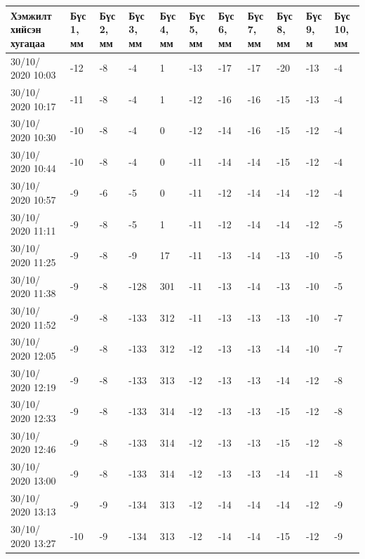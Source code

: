 \begin{table}[h]
    \centering
    \begin{tabular}{|p{1.5cm}|p{0.8cm}|p{0.8cm}|p{0.8cm}|p{0.8cm}|p{0.8cm}|p{0.8cm}|p{0.8cm}|p{0.8cm}|p{0.8cm}|p{0.8cm}|}
         \hline
     Хэмжилт хийсэн хугацаа & Бүс 1, мм&	Бүс 2, мм&	Бүс 3, мм&	Бүс 4, мм&	Бүс 5, мм&	Бүс 6, мм&	Бүс 7, мм&	Бүс 8, мм&	Бүс 9, м&	Бүс 10, мм\\ \hline
30/10/ 2020 10:03&	-12&	-8&	-4&	    1&	-13&-17&-17&-20&	-13&	-4\\ \hline
30/10/ 2020 10:17&	-11&	-8&	-4&	    1&	-12&-16&-16&-15&	-13&	-4\\ \hline
30/10/ 2020 10:30&	-10&	-8&	-4&	    0&	-12&-14&-16&-15&	-12&	-4\\ \hline
30/10/ 2020 10:44&	-10&	-8&	-4&	    0&	-11&-14&-14&-15&	-12&	-4\\ \hline
30/10/ 2020 10:57&	-9&	    -6&	-5&	    0&	-11&-12&-14&-14&	-12&	-4\\ \hline
30/10/ 2020 11:11&	-9&	    -8&	-5&	    1&	-11&-12&-14&-14&	-12&	-5\\ \hline
30/10/ 2020 11:25&	-9&	    -8&	-9&	    17&	-11&-13&-14&-13&	-10&	-5\\ \hline
30/10/ 2020 11:38&	-9&	    -8&	-128&	301&-11&-13&-14&-13&	-10&	-5\\ \hline
30/10/ 2020 11:52&	-9&	    -8&	-133&	312&-11&-13&-13&-13&	-10&	-7\\ \hline
30/10/ 2020 12:05&	-9&	    -8&	-133&	312&-12&-13&-13&-14&	-10&	-7\\ \hline
30/10/ 2020 12:19&	-9&	    -8&	-133&	313&-12&-13&-13&-14&	-12&	-8\\ \hline
30/10/ 2020 12:33&	-9&	    -8&	-133&	314&-12&-13&-13&-15&	-12&	-8\\ \hline
30/10/ 2020 12:46&	-9&	    -8&	-133&	314&-12&-13&-13&-15&	-12&	-8\\ \hline
30/10/ 2020 13:00&	-9&	    -8&	-133&	314&-12&-13&-13&-14&	-11&	-8\\ \hline
30/10/ 2020 13:13&	-9&	    -9&	-134&	313&-12&-14&-14&-14&	-12&	-9\\ \hline
30/10/ 2020 13:27&	-10&	-9&	-134&	313&-12&-14&-14&-15&	-12&	-9\\ \hline
    \end{tabular}
\end{table}
